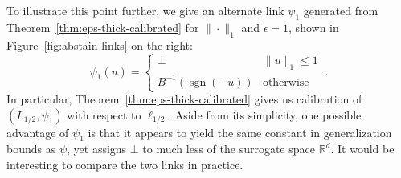 \documentclass[12pt]{article}
\newcommand{\reals}{\mathbb{R}}
\newcommand{\ellabs}[1]{\ell_{#1}}
\DeclareMathOperator*{\sgn}{sgn}
\begin{document}
To illustrate this point further, we give an alternate link $\psi_1$ generated from Theorem~\ref{thm:eps-thick-calibrated} for $\|\cdot\|_1$ and $\epsilon=1$, shown in Figure~\ref{fig:abstain-links} on the right:
\begin{equation}\label{eq:abstain-link-1}
  \psi_1(u) = \begin{cases}
	\bot & \|u\|_1 \leq 1\\
	B^{-1}(\sgn(-u)) &\text{otherwise}
  \end{cases}~.
\end{equation}
In particular, Theorem~\ref{thm:eps-thick-calibrated} gives us calibration of $(L_{1/2},\psi_1)$ with respect to $\ellabs{1/2}$.
Aside from its simplicity, one possible advantage of $\psi_1$ is that it appears to yield the same constant in generalization bounds as $\psi$, yet assigns $\bot$ to much less of the surrogate space $\reals^d$.
It would be interesting to compare the two links in practice.
\end{document}

